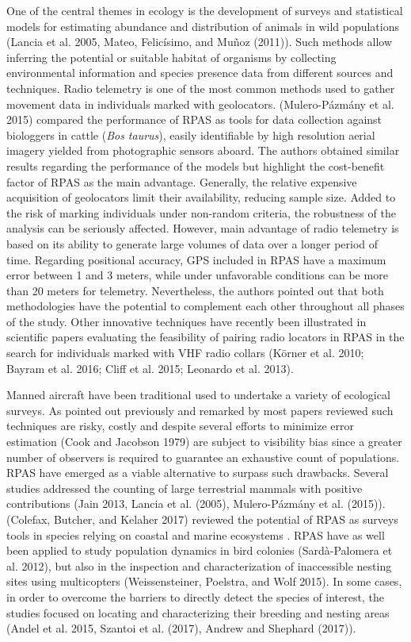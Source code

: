 \documentclass[]{interact}
\theoremstyle{plain}%
\theoremstyle{definition}
\theoremstyle{remark}
\begin{document}
One of the central themes in ecology is the development of surveys and
statistical models for estimating abundance and distribution of animals
in wild populations (Lancia et al. 2005, Mateo, Felicísimo, and Muñoz
(2011)). Such methods allow inferring the potential or suitable habitat
of organisms by collecting environmental information and species
presence data from different sources and techniques. Radio telemetry is
one of the most common methods used to gather movement data in
individuals marked with geolocators. (Mulero-Pázmány et al. 2015)
compared the performance of RPAS as tools for data collection against
biologgers in cattle (\emph{Bos taurus}), easily identifiable by high
resolution aerial imagery yielded from photographic sensors aboard. The
authors obtained similar results regarding the performance of the models
but highlight the cost-benefit factor of RPAS as the main advantage.
Generally, the relative expensive acquisition of geolocators limit their
availability, reducing sample size. Added to the risk of marking
individuals under non-random criteria, the robustness of the analysis
can be seriously affected. However, main advantage of radio telemetry is
based on its ability to generate large volumes of data over a longer
period of time. Regarding positional accuracy, GPS included in RPAS have
a maximum error between 1 and 3 meters, while under unfavorable
conditions can be more than 20 meters for telemetry. Nevertheless, the
authors pointed out that both methodologies have the potential to
complement each other throughout all phases of the study. Other
innovative techniques have recently been illustrated in scientific
papers evaluating the feasibility of pairing radio locators in RPAS in
the search for individuals marked with VHF radio collars (Körner et al.
2010; Bayram et al. 2016; Cliff et al. 2015; Leonardo et al. 2013).

Manned aircraft have been traditional used to undertake a variety of
ecological surveys. As pointed out previously and remarked by most
papers reviewed such techniques are risky, costly and despite several
efforts to minimize error estimation (Cook and Jacobson 1979) are
subject to visibility bias since a greater number of observers is
required to guarantee an exhaustive count of populations. RPAS have
emerged as a viable alternative to surpass such drawbacks. Several
studies addressed the counting of large terrestrial mammals with
positive contributions (Jain 2013, Lancia et al. (2005), Mulero-Pázmány
et al. (2015)). (Colefax, Butcher, and Kelaher 2017) reviewed the
potential of RPAS as surveys tools in species relying on coastal and
marine ecosystems . RPAS have as well been applied to study population
dynamics in bird colonies (Sardà-Palomera et al. 2012), but also in the
inspection and characterization of inaccessible nesting sites using
multicopters (Weissensteiner, Poelstra, and Wolf 2015). In some cases,
in order to overcome the barriers to directly detect the species of
interest, the studies focused on locating and characterizing their
breeding and nesting areas (Andel et al. 2015, Szantoi et al. (2017),
Andrew and Shephard (2017)).
\end{document}
